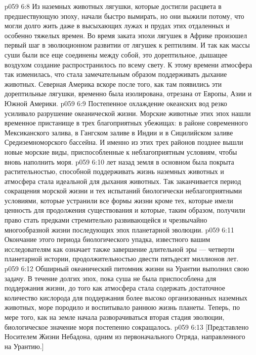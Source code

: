 \vs p059 6:8 \pc Из наземных животных лягушки, которые достигли расцвета в предшествующую эпоху, начали быстро вымирать, но они выжили потому, что могли долго жить даже в высыхающих лужах и прудах этих отдаленных и особенно тяжелых времен. Во время заката эпохи лягушек в Африке произошел первый шаг в эволюционном развитии от лягушек к рептилиям. И так как массы суши были все еще соединены между собой, это дорептильное, дышащее воздухом создание распространилось по всему свету. К этому времени атмосфера так изменилась, что стала замечательным образом поддерживать дыхание животных. Северная Америка вскоре после того, как там появились эти дорептильные лягушки, временно была изолирована, отрезана от Европы, Азии и Южной Америки.
\vs p059 6:9 Постепенное охлаждение океанских вод резко усиливало разрушение океанической жизни. Морские животные этих эпох нашли временное пристанище в трех благоприятных убежищах: в районе современного Мексиканского залива, в Гангском заливе в Индии и в Сицилийском заливе Средиземноморского бассейна. И именно из этих трех районов позднее вышли новые морские виды, приспособленные к неблагоприятным условиям, чтобы вновь наполнить моря.
\vs p059 6:10 \pc {} лет назад земля в основном была покрыта растительностью, способной поддерживать жизнь наземных животных и атмосфера стала идеальной для дыхания животных. Так заканчивается период сокращения морской жизни и тех испытаний биологически неблагоприятными условиями, которые устранили все формы жизни кроме тех, которые имели ценность для продолжения существования и которые, таким образом, получили право стать предками стремительно развивающейся и чрезвычайно многообразной жизни последующих эпох планетарной эволюции.
\vs p059 6:11 Окончание этого периода биологического упадка, известного вашим исследователям как  означает также завершение длительной  эры --- четверти планетарной истории, продолжительностью двести пятьдесят миллионов лет.
\vs p059 6:12 Обширный океанический питомник жизни на Урантии выполнил свою задачу. В течение долгих эпох, пока суша не была приспособлена для поддержания жизни, до того как атмосфера стала содержать достаточное количество кислорода для поддержания более высоко организованных наземных животных, море породило и воспитывало раннюю жизнь планеты. Теперь, по мере того, как на земле начала разворачиваться вторая стадия эволюции, биологическое значение моря постепенно сокращалось.
\vsetoff
\vs p059 6:13 [Представлено Носителем Жизни Небадона, одним из первоначального Отряда, направленного на Урантию.]
